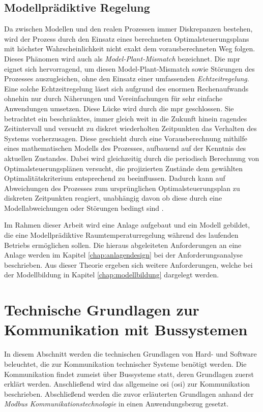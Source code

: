 \subsection{Modellprädiktive Regelung}

Da zwischen Modellen und den realen Prozessen immer Diskrepanzen bestehen, wird der Prozess durch den Einsatz eines berechneten Optimalsteuerungsplans mit höchster Wahrscheinlichkeit nicht exakt dem vorausberechneten Weg folgen. Dieses Phänomen wird auch als \textit{Model-Plant-Mismatch} bezeichnet. Die \acrlong{mpr} eignet sich hervorragend, um diesen Model-Plant-Mismatch sowie Störungen des Prozesses auszugleichen, ohne den Einsatz einer umfassenden \textit{Echtzeitregelung}. Eine solche Echtzeitregelung lässt sich aufgrund des enormen Rechenaufwands ohnehin nur durch Näherungen und Vereinfachungen für sehr einfache Anwendungen umsetzen. Diese Lücke wird durch die \acrlong{mpr} geschlossen. Sie betrachtet ein beschränktes, immer gleich weit in die Zukunft hinein ragendes Zeitintervall und versucht zu diskret wiederholten Zeitpunkten das Verhalten des Systems vorherzusagen. Diese geschieht durch eine Vorausberechnung mithilfe eines mathematischen Modells des Prozesses, aufbauend auf der Kenntnis des aktuellen Zustandes. Dabei wird gleichzeitig durch die periodisch Berechnung von Optimalsteuerungsplänen versucht, die projizierten Zustände dem gewählten Optimalitätskriterium entsprechend zu beeinflussen. Dadurch kann auf Abweichungen des Prozesses zum ursprünglichen Optimalsteuerungsplan zu diskreten Zeitpunkten reagiert, unabhängig davon ob diese durch eine Modellabweichungen oder Störungen bedingt sind \cite[S.~71]{di14}.

Im Rahmen dieser Arbeit wird eine Anlage aufgebaut und ein Modell gebildet, die eine Modellprädiktive Raumtemperaturregelung während des laufenden Betriebs ermöglichen sollen. 
Die hieraus abgeleiteten Anforderungen an eine Anlage werden im Kapitel \ref{chap:anlagendesign} bei der Anforderungsanalyse beschrieben.
Aus dieser Theorie ergeben sich weitere Anforderungen, welche bei der Modellbildung in Kapitel \ref{chap:modellbildung} dargelegt werden.


\section{Technische Grundlagen zur Kommunikation mit Bussystemen}
\label{sec:grundlagenbus}

In diesem Abschnitt werden die technischen Grundlagen von Hard- und Software beleuchtet, die zur Kommunikation technischer Systeme benötigt werden. Die Kommunikation findet zumeist über Bussysteme statt, deren Grundlagen zuerst erklärt werden. Anschließend wird das allgemeine \acrlong{osi} (\acrshort{osi}) zur Kommunikation beschrieben. Abschließend werden die zuvor erläuterten Grundlagen anhand der \textit{Modbus Kommunikationstechnologie} in einen Anwendungsbezug gesetzt.

